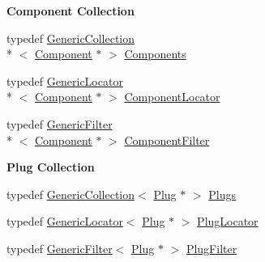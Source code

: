 \begin{Indent}{\bf Component Collection}\par
\begin{DoxyCompactItemize}
\item 
typedef \hyperlink{classHurricane_1_1GenericCollection}{Generic\-Collection}\\*
$<$ \hyperlink{classHurricane_1_1Component}{Component} $\ast$ $>$ \hyperlink{namespaceHurricane_a7d26d99aeb5dd6d70d51bd35d2473e72}{Components}
\item 
typedef \hyperlink{classHurricane_1_1GenericLocator}{Generic\-Locator}\\*
$<$ \hyperlink{classHurricane_1_1Component}{Component} $\ast$ $>$ \hyperlink{namespaceHurricane_ad72b1998a4ff6e68326469dec9887f4d}{Component\-Locator}
\item 
typedef \hyperlink{classHurricane_1_1GenericFilter}{Generic\-Filter}\\*
$<$ \hyperlink{classHurricane_1_1Component}{Component} $\ast$ $>$ \hyperlink{namespaceHurricane_acbfacb3aada84aa054e587817f204e90}{Component\-Filter}
\end{DoxyCompactItemize}
\end{Indent}
\begin{Indent}{\bf Plug Collection}\par
\begin{DoxyCompactItemize}
\item 
typedef \hyperlink{classHurricane_1_1GenericCollection}{Generic\-Collection}$<$ \hyperlink{classHurricane_1_1Plug}{Plug} $\ast$ $>$ \hyperlink{namespaceHurricane_ac8335d2057483ee7a935c15a9460c64f}{Plugs}
\item 
typedef \hyperlink{classHurricane_1_1GenericLocator}{Generic\-Locator}$<$ \hyperlink{classHurricane_1_1Plug}{Plug} $\ast$ $>$ \hyperlink{namespaceHurricane_a99a5e89f593de242e24a24b632b0534e}{Plug\-Locator}
\item 
typedef \hyperlink{classHurricane_1_1GenericFilter}{Generic\-Filter}$<$ \hyperlink{classHurricane_1_1Plug}{Plug} $\ast$ $>$ \hyperlink{namespaceHurricane_ad6b0bd4bdff4c52e6163b9f54e3e5c92}{Plug\-Filter}
\end{DoxyCompactItemize}
\end{Indent}
